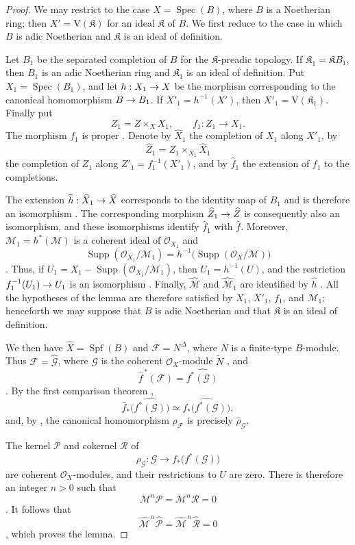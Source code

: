 \documentclass[oneside]{amsart}
\theoremstyle{ega-env-style}
\theoremstyle{ega-thm-env-style}
\theoremstyle{ega-defn-env-style}
\def\mathcal{\mathscr}
\def\sh{\mathcal}                   %
\def\Supp{\operatorname{Supp}}
\def\Spec{\operatorname{Spec}}
\def\Spf{\operatorname{Spf}}
\renewcommand{\to}{\mathchoice{\longrightarrow}{\rightarrow}{\rightarrow}{\rightarrow}}
\newcommand{\oldpage}[2][]{{\marginnote{\normalfont{\textbf{#1}~|~#2}}}\ignorespaces}
\begin{document}
\begin{proof}
We may restrict to the case $X=\Spec(B)$, where $B$ is a
Noetherian ring; then $X'=\mathrm{V}(\mathfrak{K})$ for an ideal
$\mathfrak{K}$ of $B$.  We first reduce to the case in which $B$ is
adic Noetherian and $\mathfrak{K}$ is an ideal of definition.

Let $B_1$ be the separated completion of $B$ for the
$\mathfrak{K}$-preadic topology.
\oldpage[III]{155}
If $\mathfrak{K}_1=\mathfrak{K}B_1$, then $B_1$ is an adic
Noetherian ring and $\mathfrak{K}_1$ is an ideal of definition.
Put $X_1=\Spec(B_1)$, and let $h:X_1\to X$ be the morphism
corresponding to the canonical homomorphism $B\to B_1$.  If
$X'_1=h^{-1}(X')$, then $X'_1=\mathrm{V}(\mathfrak{K}_1)$.  Finally
put
\[
  Z_1=Z\times_X X_1,\qquad f_1:Z_1\longrightarrow X_1.
\]
The morphism $f_1$ is proper .  Denote by
$\widehat{X}_1$ the completion of $X_1$ along $X'_1$, by
\[
  \widehat{Z}_1=
  Z_1\times_{X_1}\widehat{X}_1
\]
the completion of $Z_1$ along
$Z'_1=f_1^{-1}(X'_1)$, and by
$\widehat{f}_1$ the extension of $f_1$ to the completions.

The extension
$\widehat{h}:\widehat{X}_1\to\widehat{X}$ corresponds to the
identity map of $B_1$ and is therefore an isomorphism
.  The corresponding morphism
$\widehat{Z}_1\to\widehat{Z}$ is consequently also an isomorphism,
and these isomorphisms identify $\widehat{f}_1$ with
$\widehat{f}$.  Moreover,
$\sh{M}_1=h^*(\sh{M})$ is a coherent ideal of $\sh{O}_{X_1}$ and
\[
  \Supp(\sh{O}_{X_1}/\sh{M}_1)
  =h^{-1}\bigl(\Supp(\sh{O}_X/\sh{M})\bigr)
\]
.  Thus, if
$U_1=X_1-\Supp(\sh{O}_{X_1}/\sh{M}_1)$, then
$U_1=h^{-1}(U)$, and the restriction
$f_1^{-1}(U_1)\to U_1$ is an isomorphism
.  Finally, $\widehat{\sh{M}}$ and
$\widehat{\sh{M}}_1$ are identified by $\widehat{h}$
.  All the hypotheses of the lemma are therefore
satisfied by $X_1$, $X'_1$, $f_1$, and $\sh{M}_1$; henceforth we
may suppose that $B$ is adic Noetherian and that $\mathfrak{K}$ is
an ideal of definition.

We then have $\widehat{X}=\Spf(B)$ and
$\sh{F}=N^\Delta$, where $N$ is a finite-type $B$-module.  Thus
$\sh{F}=\widehat{\sh{G}}$, where $\sh{G}$ is the coherent
$\sh{O}_X$-module $\widetilde{N}$ , and
\[
  \widehat{f}^{\,*}(\sh{F})
  =\widehat{f^*(\sh{G})}
\]
.  By the first comparison theorem
,
\[
  \widehat{f}_*
  \bigl(\widehat{f^*(\sh{G})}\bigr)
  \simeq
  \widehat{f_*\bigl(f^*(\sh{G})\bigr)},
\]
and, by , the canonical homomorphism
$\rho_{\sh{F}}$ is precisely $\widehat{\rho}_{\sh{G}}$.

The kernel $\sh{P}$ and cokernel $\sh{R}$ of
\[
  \rho_{\sh{G}}:
  \sh{G}\longrightarrow f_*\bigl(f^*(\sh{G})\bigr)
\]
are coherent $\sh{O}_X$-modules, and their restrictions to $U$ are
zero.  There is therefore an integer $n>0$ such that
\[
  \sh{M}^n\sh{P}=\sh{M}^n\sh{R}=0
\]
.  It follows that
\[
  \widehat{\sh{M}}^{\,n}\widehat{\sh{P}}
  =
  \widehat{\sh{M}}^{\,n}\widehat{\sh{R}}
  =0
\]
 , which proves the lemma.
\end{proof}
\end{document}

